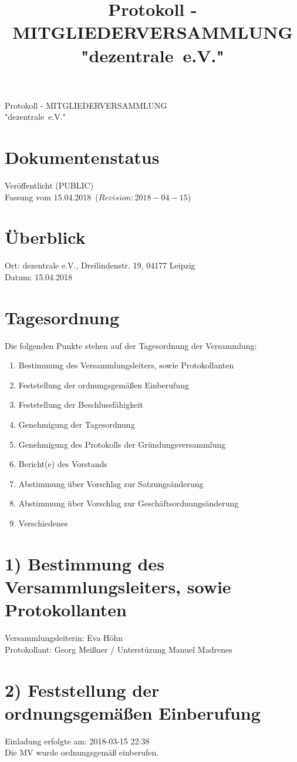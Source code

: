 \documentclass[10pt,a4paper]{scrartcl}
\newcommand{\qs}[1]{"#1"}
\newcommand{\name}{dezentrale}
\newcommand{\revision}{$Revision: 2018-04-15$}
\newcommand{\eventdate}{15.04.2018}
\newcommand{\documentstatus}{Ver{\"o}ffentlicht (PUBLIC)}
\begin{document}
\title{Protokoll - MITGLIEDERVERSAMMLUNG \qs{\name\ e.V.}}
{\LARGE Protokoll - MITGLIEDERVERSAMMLUNG\\ \qs{\name\ e.V.}}

\section*{Dokumentenstatus}
\documentstatus\\
Fassung vom \eventdate\ (\revision)

\section*{{\"U}berblick}
    Ort: dezentrale e.V., Dreilindenstr. 19, 04177 Leipzig\\
    Datum: \eventdate

\section*{Tagesordnung}
	Die folgenden Punkte stehen auf der Tagesordnung der Versammlung:
	\begin{enumerate}
		\item Bestimmung des Versammlungsleiters, sowie Protokollanten
		\item Feststellung der ordnungsgem{\"a}{\ss}en Einberufung
		\item Feststellung der Beschlussf{\"a}higkeit
		\item Genehmigung der Tagesordnung
		\item Genehmigung des Protokolls der Gr{\"u}ndungsversammlung
		\item Bericht(e) des Vorstands
		\item Abstimmung {\"u}ber Vorschlag zur Satzungs{\"a}nderung
		\item Abstimmung {\"u}ber Vorschlag zur Gesch{\"a}ftsordnungs{\"a}nderung
		\item Verschiedenes
	\end{enumerate}

\section*{1) Bestimmung des Versammlungsleiters, sowie Protokollanten}
	Versammlungsleiterin: Eva H{\"o}hn\\
	Protokollant: Georg Mei{\ss}ner / Unterst{\"u}zung Manuel Madrenes

\section*{2) Feststellung der ordnungsgem{\"a}{\ss}en Einberufung}
Einladung erfolgte am: 2018-03-15 22:38\\
Die MV wurde ordnungsgem{\"a}{\ss} einberufen.
\\
\end{document}
